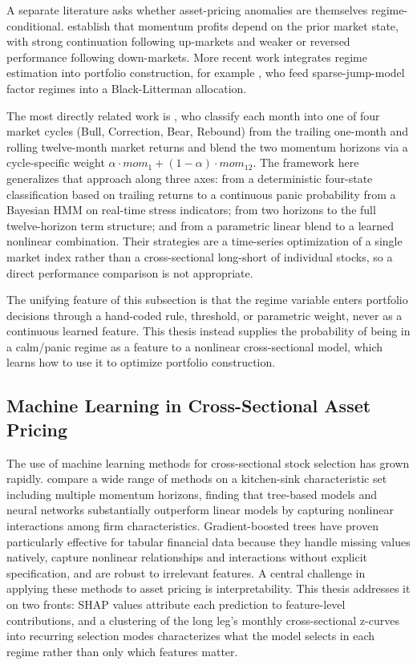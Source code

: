 A separate literature asks whether asset-pricing anomalies are themselves regime-conditional. \citet{Cooper2004} establish that momentum profits depend on the prior market state, with strong continuation following up-markets and weaker or reversed performance following down-markets. More recent work integrates regime estimation into portfolio construction, for example \citet{ShuMulvey2024}, who feed sparse-jump-model factor regimes into a Black-Litterman allocation.

The most directly related work is \citet{GHM2023}, who classify each month into one of four market cycles (Bull, Correction, Bear, Rebound) from the trailing one-month and rolling twelve-month market returns and blend the two momentum horizons via a cycle-specific weight $\alpha \cdot mom_1 + (1-\alpha) \cdot mom_{12}$. The framework here generalizes that approach along three axes: from a deterministic four-state classification based on trailing returns to a continuous panic probability from a Bayesian HMM on real-time stress indicators; from two horizons to the full twelve-horizon term structure; and from a parametric linear blend to a learned nonlinear combination. Their strategies are a time-series optimization of a single market index rather than a cross-sectional long-short of individual stocks, so a direct performance comparison is not appropriate.

The unifying feature of this subsection is that the regime variable enters portfolio decisions through a hand-coded rule, threshold, or parametric weight, never as a continuous learned feature. This thesis instead supplies the probability of being in a calm/panic regime as a feature to a nonlinear cross-sectional model, which learns how to use it to optimize portfolio construction.

\subsection{Machine Learning in Cross-Sectional Asset Pricing}\label{sec:lit_ml}

The use of machine learning methods for cross-sectional stock selection has grown rapidly. \citet{Gu2020} compare a wide range of methods on a kitchen-sink characteristic set including multiple momentum horizons, finding that tree-based models and neural networks substantially outperform linear models by capturing nonlinear interactions among firm characteristics. Gradient-boosted trees \citep{Chen2016} have proven particularly effective for tabular financial data because they handle missing values natively, capture nonlinear relationships and interactions without explicit specification, and are robust to irrelevant features. A central challenge in applying these methods to asset pricing is interpretability. This thesis addresses it on two fronts: SHAP values \citep{Lundberg2017, Lundberg2020} attribute each prediction to feature-level contributions, and a clustering of the long leg's monthly cross-sectional z-curves into recurring selection modes characterizes what the model selects in each regime rather than only which features matter.

